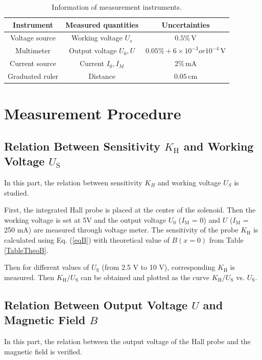 \documentclass{article}
\begin{document}
\begin{table}[htbp]
\centering
\begin{tabular}{ccc}
\toprule
Instrument & Measured quantities & Uncertainties \\ 
\hline
Voltage source & Working voltage $U_{s}$ & $0.5\%\,$V \\ 
Multimeter & Output voltage $U_{0}, U$ & $0.05\% + 6\times 10^{-3} or 10^{-4}\,$V \\ 
Current source & Current $I_{0}, I_{M}$ & $2\%\,$mA \\ 
Graduated ruler & Distance & $0.05\,$cm \\
\bottomrule
\end{tabular}
\caption{Information of measurement instruments.}\label{tablePrecision}
\end{table}



		\section{Measurement Procedure}
		
	\subsection{Relation Between Sensitivity $K_\text{H}$ and Working Voltage $U_\text{S}$\label{proc}}
	
In this part, the relation between sensitivity $K_{H}$ and working voltage $U_{S}$ is studied.

First, the integrated Hall probe is placed at the center of the solenoid. Then the working voltage is set at 5V and the output voltage $U_0$ ($I_\text{M}$ = 0) and $U$ ($I_\text{M}$ = 250 mA) are measured through voltage meter.  The sensitivity of the probe $K_\text{H}$ is calculated using Eq. (\ref{eqB}) with theoretical value of $B(x = 0)$ from Table \ref{TableTheoB}.

Then for different values of $U_\text{S}$ (from 2.5 V to 10 V), corresponding $K_\text{H}$ is measured. Then $K_\text{H}/U_\text{S}$ can be obtained and plotted as the curve $K_\text{H}/U_\text{S}$ vs. $U_\text{S}$.


	\subsection{Relation Between Output Voltage $U$ and Magnetic Field $B$}

In this part, the relation between the output voltage of the Hall probe and the magnetic field is verified. 
\end{document}
